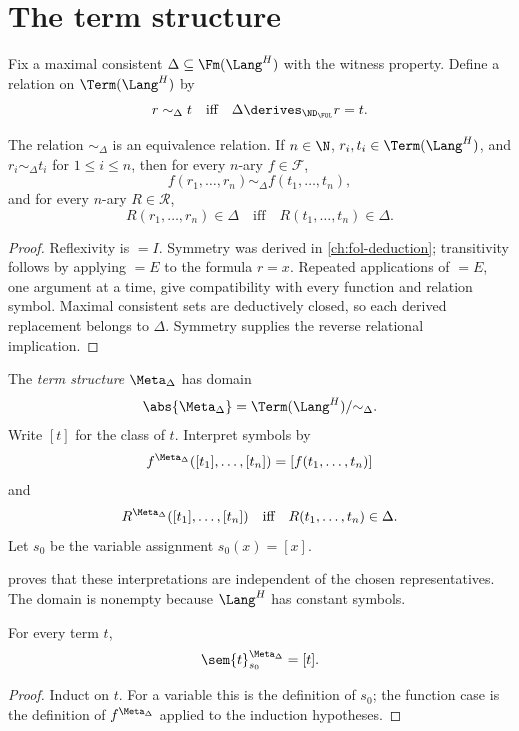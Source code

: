 \section{The term structure}
\label{sec:fol-metatheory-02}

Fix a maximal consistent \(\Delta\subseteq\Fm(\Lang^H)\) with the witness
property.  Define a relation on \(\Term(\Lang^H)\) by
\[
 r\sim_\Delta t
 \quad\text{iff}\quad
 \Delta\derives_{\ND_{\FOL}}r=t.
\]

\begin{lemma}
\label{lem:equality-congruence}
The relation \(\sim_\Delta\) is an equivalence relation.  If
\(n\in\N\), \(r_i,t_i\in\Term(\Lang^H)\), and
\(r_i\sim_\Delta t_i\) for \(1\leq i\leq n\), then for every
\(n\)-ary \(f\in\mathcal F\),
\[
 f(r_1,\ldots,r_n)\sim_\Delta f(t_1,\ldots,t_n),
\]
and for every \(n\)-ary \(R\in\mathcal R\),
\[
 R(r_1,\ldots,r_n)\in\Delta
 \quad\text{iff}\quad
 R(t_1,\ldots,t_n)\in\Delta.
\]
\end{lemma}
\begin{proof}
Reflexivity is \(=I\).  Symmetry was derived in
\cref{ch:fol-deduction}; transitivity follows by applying \(=E\) to the
formula \(r=x\).  Repeated applications of \(=E\), one argument at a time,
give compatibility with every function and relation symbol.  Maximal
consistent sets are deductively closed, so each derived replacement belongs
to \(\Delta\).  Symmetry supplies the reverse relational implication.
\end{proof}

\begin{definition}
The \emph{term structure} \(\Meta_\Delta\) has domain
\[
 \abs{\Meta_\Delta}
 =\Term(\Lang^H)/{\sim_\Delta}.
\]
Write \([t]\) for the class of \(t\).  Interpret symbols by
\[
 f^{\Meta_\Delta}([t_1],\ldots,[t_n])
 =[f(t_1,\ldots,t_n)]
\]
and
\[
 R^{\Meta_\Delta}([t_1],\ldots,[t_n])
 \quad\text{iff}\quad
 R(t_1,\ldots,t_n)\in\Delta.
\]
Let \(s_0\) be the variable assignment \(s_0(x)=[x]\).
\end{definition}

 proves that these interpretations are
independent of the chosen representatives.  The domain is nonempty
because \(\Lang^H\) has constant symbols.

\begin{lemma}
\label{lem:term-model-evaluation}
For every term \(t\),
\[
 \sem{t}^{\Meta_\Delta}_{s_0}=[t].
\]
\end{lemma}
\begin{proof}
Induct on \(t\).  For a variable this is the definition of \(s_0\); the
function case is the definition of \(f^{\Meta_\Delta}\) applied to the
induction hypotheses.
\end{proof}

